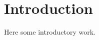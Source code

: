 \documentclass[12pt,a4paper]{report}
\theoremstyle{definition}
\begin{document}
\setcounter{page}{0}
\pagestyle{headings}
\tableofcontents
{}
 


\chapter{Introduction}
Here some introductory work. 



\end{document}
